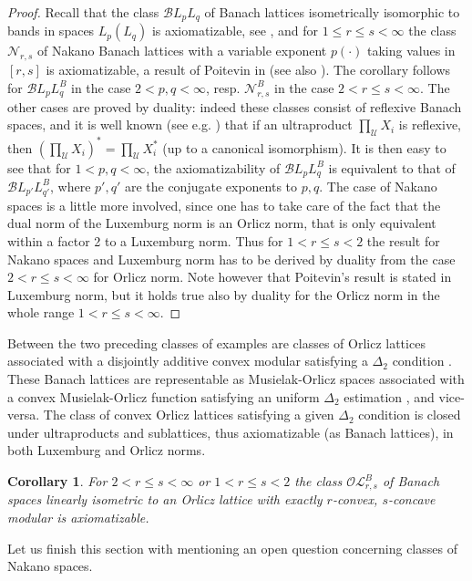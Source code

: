 \documentclass[11pt]{amsart}
\theoremstyle{plain}
\newtheorem{corollary}[theorem]{Corollary}
\theoremstyle{remark}
\newcommand{\U}{\mathcal U}
\begin{document}
\begin{proof} Recall that the class $\mathcal BL_pL_q$ of  Banach lattices isometrically isomorphic to bands in spaces $L_p(L_q)$ is axiomatizable, see \cite{HR}, and for $1\le r\le s<\infty$ the class $\mathcal N_{r,s}$ of Nakano Banach lattices  with a variable exponent $p(\cdot)$ taking values in $[r,s]$ is axiomatizable, a result of Poitevin in \cite{P} (see also \cite{PR}). The corollary follows for $\mathcal BL_pL_q^B$ in the case $2<p,q<\infty$, resp. $\mathcal N_{r,s}^B$ in the case $2<r\le s<\infty$. The other cases are proved by duality: indeed these classes consist of reflexive Banach spaces, and it is well known (see e.g. \cite{H}) that if an ultraproduct $\prod_\U X_i$ is reflexive, then $(\prod_\U X_i)^*=\prod_\U X_i^*$ (up to a canonical isomorphism). It is then easy to see that for $1<p,q<\infty$, the axiomatizability of  $\mathcal BL_pL_q^B$ is equivalent to that of $\mathcal BL_{p'}L_{q'}^B$, where $p',q'$ are the conjugate exponents to $p,q$. The case of  Nakano spaces is a little more involved, since one has to take care of the fact that the dual norm of the Luxemburg norm is an Orlicz norm, that is only equivalent within a factor 2 to a Luxemburg norm. Thus for $1<r\le s<2$ the result for Nakano spaces and Luxemburg norm has to be derived by duality from the case $2<r\le s<\infty$ for Orlicz norm. Note however that Poitevin's result is stated in Luxemburg norm, but it holds true also by duality for the Orlicz norm in the whole range $1<r\le s<\infty$.
\end{proof}


Between the two preceding classes of examples are classes of Orlicz lattices associated with a disjointly additive convex modular satisfying a $\Delta_2$ condition \cite{CZ}. These Banach lattices are representable as Musielak-Orlicz spaces  associated with a convex Musielak-Orlicz function satisfying an uniform $\Delta_2$ estimation \cite{W81,W84}, and vice-versa. The class of convex Orlicz lattices satisfying a given $\Delta_2$ condition is closed under ultraproducts \cite{W84} and sublattices, thus axiomatizable (as Banach lattices), in both Luxemburg and Orlicz norms.

\begin{corollary}
For $2<r\le s<\infty$ or $1<r\le s<2$ the class $\mathcal {OL}_{r,s}^B$ of Banach spaces linearly isometric to an Orlicz lattice with exactly $r$-convex, $s$-concave modular is axiomatizable.
\end{corollary}

Let us finish this section with mentioning an open question concerning classes of Nakano spaces.
\end{document}
